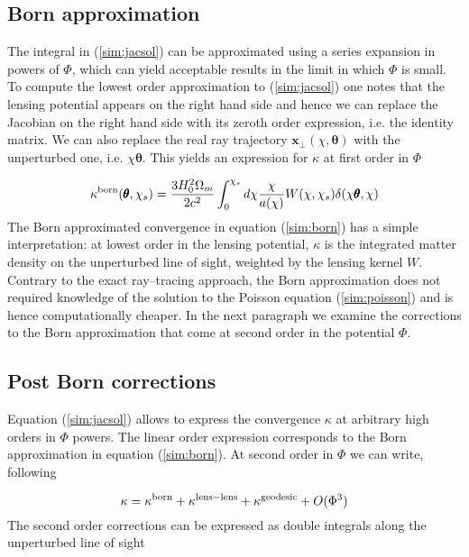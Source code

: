 \documentclass[reprint,aps,prd,superscriptaddress,showkeys,showpacs]{revtex4-1}
\newcommand{\bb}[1]{\mathbf{#1}}
\newcommand\pt{\pmb{\theta}}
\begin{document}
\subsection{Born approximation}
The integral in (\ref{sim:jacsol}) can be approximated using a series expansion in powers of $\Phi$, which can yield acceptable results in the limit in which $\Phi$ is small. To compute the lowest order approximation to (\ref{sim:jacsol}) one notes that the lensing potential appears on the right hand side and hence we can replace the Jacobian on the right hand side with its zeroth order expression, i.e. the identity matrix. We can also replace the real ray trajectory $\bb{x}_\perp(\chi,\pt)$ with the unperturbed one, i.e. $\chi\pt$. This yields an expression for $\kappa$ at first order in $\Phi$

\begin{equation}
\label{sim:born}
\kappa^{\rm born}(\pt,\chi_s) = \frac{3H_0^2\Omega_m}{2c^2}\int_0^{\chi_s} d\chi\frac{\chi}{a(\chi)} W(\chi,\chi_s)\delta(\chi\pt,\chi)
\end{equation}
%
The Born approximated convergence in equation (\ref{sim:born}) has a simple interpretation: at lowest order in the lensing potential, $\kappa$ is the integrated matter density on the unperturbed line of sight, weighted by the lensing kernel $W$. Contrary to the exact ray--tracing approach, the Born approximation does not required knowledge of the solution to the Poisson equation (\ref{sim:poisson}) and is hence computationally cheaper. In the next paragraph we examine the corrections to the Born approximation that come at second order in the potential $\Phi$.  

\subsection{Post Born corrections}
Equation (\ref{sim:jacsol}) allows to express the convergence $\kappa$ at arbitrary high orders in $\Phi$ powers. The linear order expression corresponds to the Born approximation in equation (\ref{sim:born}). At second order in $\Phi$ we can write, following \citep{WLBispectrumDodelson}

\begin{equation}
\kappa = \kappa^{\rm born} + \kappa^{\rm lens-lens} + \kappa^{\rm geodesic} + O(\Phi^3)
\end{equation}
%
The second order corrections can be expressed as double integrals along the unperturbed line of sight
\end{document}
